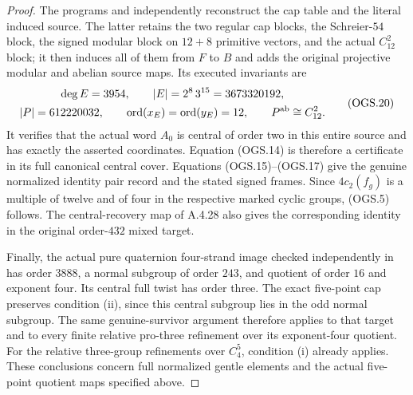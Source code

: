 \begin{proof}
The programs
 and
independently reconstruct the cap table and the
literal induced source.
The latter retains the two regular cap blocks,
the Schreier-$54$ block, the signed modular block
on $12+8$ primitive vectors, and the actual
$C_{12}^2$ block; it then induces all of them
from $F$ to $B$ and adds the original projective
modular and abelian source maps.
Its executed invariants are
\[
\begin{gathered}
 \deg E=3954,\qquad |E|=2^8\,3^{15}=3673320192,\\
 |P|=612220032,\qquad
 \operatorname{ord}(x_E)=\operatorname{ord}(y_E)=12,\qquad
 P^{\rm ab}\cong C_{12}^2 .
\end{gathered}                                                   \tag{OGS.20}
\]
It verifies that the actual word $A_0$ is central
of order two in this entire source and has exactly
the asserted coordinates.
Equation (OGS.14) is therefore a certificate in
its full canonical central cover.
Equations (OGS.15)--(OGS.17) give the genuine
normalized identity pair record and the stated
signed frames.
Since $4c_2(f_g)$ is a multiple of twelve and
of four in the respective marked cyclic groups,
(OGS.5) follows.
The central-recovery map of A.4.28 also gives
the corresponding identity in the original
order-$432$ mixed target.

Finally, the actual pure quaternion four-strand
image checked independently in
has order $3888$, a normal subgroup of order
$243$, and quotient of order $16$ and exponent
four.  Its central full twist has order three.
The exact five-point cap preserves condition
(ii), since this central subgroup lies in the
odd normal subgroup.  The same genuine-survivor
argument therefore applies to that target and
to every finite relative pro-three refinement
over its exponent-four quotient.
For the relative three-group refinements over
$C_4^5$, condition (i) already applies.
These conclusions concern full normalized
gentle elements and the actual five-point
quotient maps specified above.
\end{proof}
